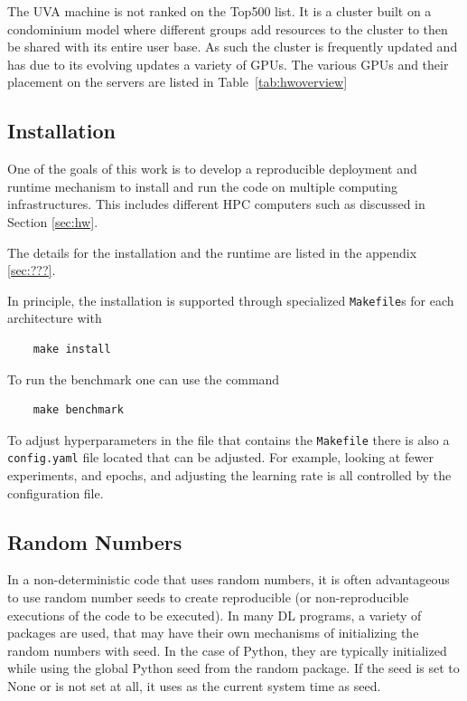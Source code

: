 \documentclass[sigplan,screen]{acmart}
\begin{document}
The UVA machine is not ranked on the Top500 list. It is a cluster built on a condominium model where different groups add resources to the cluster to then be shared with its entire user base. As such the cluster is frequently updated and has due to its evolving updates a variety of GPUs. The various GPUs and their placement on the servers are listed in Table~\ref{tab:hwoverview}




\subsection{Installation}

One of the goals of this work is to develop a reproducible deployment and runtime mechanism to install and run the code on multiple computing infrastructures. This includes different HPC computers such as discussed in Section \ref{sec:hw}.

The details for the installation and the runtime are listed in the appendix \ref{sec:???}.


In principle, the installation is supported through specialized \verb|Makefile|s for each architecture with 

\begin{verbatim}
    make install
\end{verbatim}

To run the benchmark one can use the command

\begin{verbatim}
    make benchmark
\end{verbatim}

To adjust hyperparameters in the file that contains the \verb|Makefile| there is also a \verb|config.yaml| file located that can be adjusted. For example, looking at fewer experiments, and epochs, and adjusting the learning rate is all controlled by the configuration file.


\subsection{Random Numbers}

In a non-deterministic code that uses random numbers, it is often advantageous to use random number seeds to create reproducible (or non-reproducible executions of the code to be executed). In many DL programs, a variety of packages are used, that may have their own mechanisms of initializing the random numbers with seed. In the case of Python, they are typically initialized while using the global Python seed from the random package. If the seed is set to None or is not set at all, it uses as 
the current system time as seed.
\end{document}
